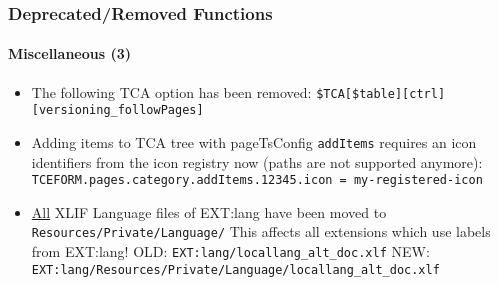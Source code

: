 \begin{frame}[fragile]
	\frametitle{Deprecated/Removed Functions}
	\framesubtitle{Miscellaneous (3)}


	\begin{itemize}

		\item The following TCA option has been removed:\newline
			\texttt{\$TCA[\$table][ctrl][versioning\_followPages]}

		\item Adding items to TCA tree with pageTsConfig \texttt{addItems} requires an icon identifiers
			from the icon registry now (paths are not supported anymore):\newline
			\smaller
				\texttt{TCEFORM.pages.category.addItems.12345.icon = my-registered-icon}
			\normalsize

		\item \underline{All} XLIF Language files of EXT:lang have been moved to\newline
			\texttt{Resources/Private/Language/}\newline
			This affects all extensions which use labels from EXT:lang!\newline
			\smaller
				OLD: \texttt{EXT:lang/locallang\_alt\_doc.xlf}\newline
				NEW: \texttt{EXT:lang/Resources/Private/Language/locallang\_alt\_doc.xlf}
			\normalsize

	\end{itemize}

\end{frame}


